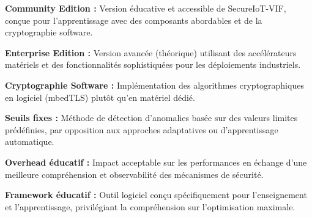 \textbf{Community Edition :} Version éducative et accessible de SecureIoT-VIF, conçue pour l'apprentissage avec des composants abordables et de la cryptographie software.

\textbf{Enterprise Edition :} Version avancée (théorique) utilisant des accélérateurs matériels et des fonctionnalités sophistiquées pour les déploiements industriels.

\textbf{Cryptographie Software :} Implémentation des algorithmes cryptographiques en logiciel (mbedTLS) plutôt qu'en matériel dédié.

\textbf{Seuils fixes :} Méthode de détection d'anomalies basée sur des valeurs limites prédéfinies, par opposition aux approches adaptatives ou d'apprentissage automatique.

\textbf{Overhead éducatif :} Impact acceptable sur les performances en échange d'une meilleure compréhension et observabilité des mécanismes de sécurité.

\textbf{Framework éducatif :} Outil logiciel conçu spécifiquement pour l'enseignement et l'apprentissage, privilégiant la compréhension sur l'optimisation maximale.